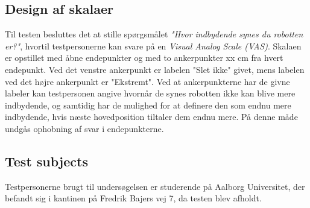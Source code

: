 \subsection*{Design af skalaer}
%
Til testen besluttes det at stille spørgsmålet \textit{"Hvor indbydende synes du robotten er?"}, hvortil testpersonerne kan svare på en \textit{Visual Analog Scale (VAS)}. Skalaen er opstillet med åbne endepunkter og med to ankerpunkter xx cm fra hvert endepunkt. Ved det venstre ankerpunkt er labelen "Slet ikke" givet, mens labelen ved det højre ankerpunkt er "Ekstremt". Ved at ankerpunkterne har de givne labeler kan testpersonen angive hvornår de synes robotten ikke kan blive mere indbydende, og samtidig har de mulighed for at definere den som endnu mere indbydende, hvis næste hovedposition tiltaler dem endnu mere. På denne måde undgås ophobning af svar i endepunkterne.


\subsection*{Test subjects}
%
Testpersonerne brugt til undersøgelsen er studerende på Aalborg Universitet, der befandt sig i kantinen på Fredrik Bajers vej 7, da testen blev afholdt. 
